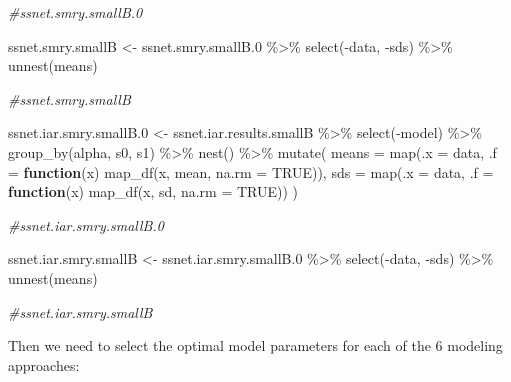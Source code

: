 \documentclass[
]{article}
\newenvironment{Shaded}{\begin{snugshade}}{\end{snugshade}}
\newcommand{\AttributeTok}[1]{\textcolor[rgb]{0.77,0.63,0.00}{#1}}
\newcommand{\CommentTok}[1]{\textcolor[rgb]{0.56,0.35,0.01}{\textit{#1}}}
\newcommand{\ConstantTok}[1]{\textcolor[rgb]{0.00,0.00,0.00}{#1}}
\newcommand{\ControlFlowTok}[1]{\textcolor[rgb]{0.13,0.29,0.53}{\textbf{#1}}}
\newcommand{\FloatTok}[1]{\textcolor[rgb]{0.00,0.00,0.81}{#1}}
\newcommand{\FunctionTok}[1]{\textcolor[rgb]{0.00,0.00,0.00}{#1}}
\newcommand{\NormalTok}[1]{#1}
\newcommand{\OtherTok}[1]{\textcolor[rgb]{0.56,0.35,0.01}{#1}}
\newcommand{\SpecialCharTok}[1]{\textcolor[rgb]{0.00,0.00,0.00}{#1}}
\begin{document}
\begin{Shaded}
\begin{Highlighting}[]
\CommentTok{\#ssnet.smry.smallB.0}

\NormalTok{ssnet.smry.smallB }\OtherTok{\textless{}{-}}\NormalTok{ ssnet.smry.smallB}\FloatTok{.0} \SpecialCharTok{\%\textgreater{}\%}
  \FunctionTok{select}\NormalTok{(}\SpecialCharTok{{-}}\NormalTok{data, }\SpecialCharTok{{-}}\NormalTok{sds) }\SpecialCharTok{\%\textgreater{}\%}
  \FunctionTok{unnest}\NormalTok{(means)}

\CommentTok{\#ssnet.smry.smallB}

\NormalTok{ssnet.iar.smry.smallB}\FloatTok{.0} \OtherTok{\textless{}{-}}\NormalTok{ ssnet.iar.results.smallB }\SpecialCharTok{\%\textgreater{}\%}
  \FunctionTok{select}\NormalTok{(}\SpecialCharTok{{-}}\NormalTok{model) }\SpecialCharTok{\%\textgreater{}\%}
  \FunctionTok{group\_by}\NormalTok{(alpha, s0, s1) }\SpecialCharTok{\%\textgreater{}\%}
  \FunctionTok{nest}\NormalTok{() }\SpecialCharTok{\%\textgreater{}\%}
  \FunctionTok{mutate}\NormalTok{(}
    \AttributeTok{means =} \FunctionTok{map}\NormalTok{(}\AttributeTok{.x =}\NormalTok{ data, }\AttributeTok{.f =} \ControlFlowTok{function}\NormalTok{(x) }\FunctionTok{map\_df}\NormalTok{(x, mean, }\AttributeTok{na.rm =} \ConstantTok{TRUE}\NormalTok{)),}
    \AttributeTok{sds =} \FunctionTok{map}\NormalTok{(}\AttributeTok{.x =}\NormalTok{ data, }\AttributeTok{.f =} \ControlFlowTok{function}\NormalTok{(x) }\FunctionTok{map\_df}\NormalTok{(x, sd, }\AttributeTok{na.rm =} \ConstantTok{TRUE}\NormalTok{))}
\NormalTok{    )}

\CommentTok{\#ssnet.iar.smry.smallB.0}

\NormalTok{ssnet.iar.smry.smallB }\OtherTok{\textless{}{-}}\NormalTok{ ssnet.iar.smry.smallB}\FloatTok{.0} \SpecialCharTok{\%\textgreater{}\%}
  \FunctionTok{select}\NormalTok{(}\SpecialCharTok{{-}}\NormalTok{data, }\SpecialCharTok{{-}}\NormalTok{sds) }\SpecialCharTok{\%\textgreater{}\%}
  \FunctionTok{unnest}\NormalTok{(means)}

\CommentTok{\#ssnet.iar.smry.smallB}
\end{Highlighting}
\end{Shaded}

Then we need to select the optimal model parameters for each of the 6
modeling approaches:
\end{document}
